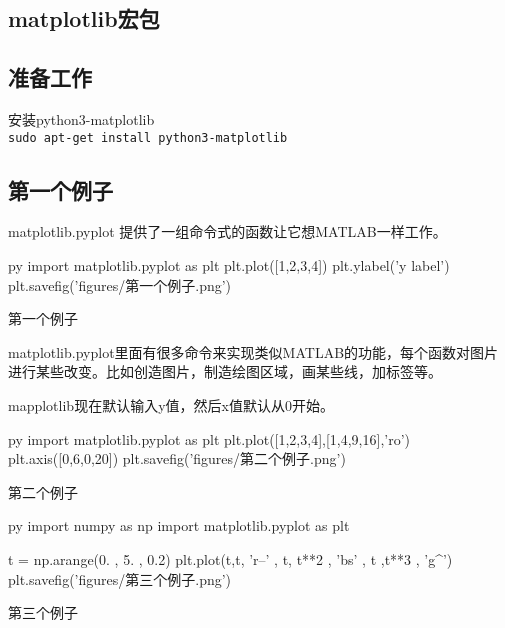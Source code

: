 \documentclass[11pt,oneside]{book}
\begin{document}
\begin{common-format}
\mainmatter


\chapter{matplotlib宏包}
\section{准备工作}
安装python3-matplotlib\\
\verb+sudo apt-get install python3-matplotlib+

\section{第一个例子}
matplotlib.pyplot 提供了一组命令式的函数让它想MATLAB一样工作。
\begin{xverbatim}[0]{py}
import matplotlib.pyplot as plt
plt.plot([1,2,3,4])
plt.ylabel('y label')
plt.savefig('figures/第一个例子.png')
\end{xverbatim}

\begin{fig}{第一个例子}
\end{fig}

matplotlib.pyplot里面有很多命令来实现类似MATLAB的功能，每个函数对图片进行某些改变。比如创造图片，制造绘图区域，画某些线，加标签等。

mapplotlib现在默认输入y值，然后x值默认从0开始。

\begin{xverbatim}[0]{py}
import matplotlib.pyplot as plt
plt.plot([1,2,3,4],[1,4,9,16],'ro')
plt.axis([0,6,0,20])
plt.savefig('figures/第二个例子.png')
\end{xverbatim}

\begin{fig}{第二个例子}
\end{fig}

\begin{xverbatim}[0]{py}
import numpy as np
import matplotlib.pyplot as plt

t = np.arange(0. , 5. , 0.2)
plt.plot(t,t, 'r--' , t, t**2 , 'bs' , t ,t**3 , 'g^')
plt.savefig('figures/第三个例子.png')
\end{xverbatim}

\begin{fig}{第三个例子}
\end{fig}



\end{common-format}
\end{document}
